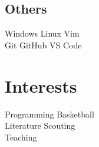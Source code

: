 \documentclass[]{deedy-resume-openfont}
\begin{document}
\begin{minipage}[t]{0.33\textwidth}
\subsection{Others}
Windows \textbullet{} Linux \textbullet{} Vim \textbullet{} \\
Git \textbullet{} GitHub \textbullet{} VS Code \\
\sectionsep

%
%

\section{Interests}
Programming \textbullet{} Basketball \textbullet{} \\
Literature \textbullet{} Scouting \textbullet{} \\
Teaching \\
\sectionsep

%
%

\end{minipage} 
\hfill
\end{document}
